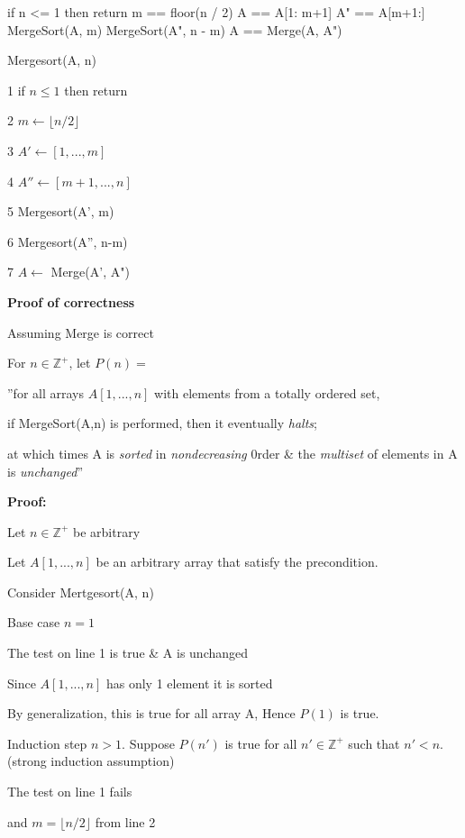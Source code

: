 \documentclass[
]{article}
\newenvironment{Shaded}{}{}
\newcommand{\NormalTok}[1]{#1}
\def\Z {{\mathbb Z}}
\begin{document}
\begin{Shaded}
\begin{Highlighting}[]
\NormalTok{	if n \textless{}= 1 then return}
\NormalTok{	m == floor(n / 2)}
\NormalTok{	A\textquotesingle{} == A[1: m+1]}
\NormalTok{	A" == A[m+1:]}
\NormalTok{	MergeSort(A\textquotesingle{}, m)}
\NormalTok{	MergeSort(A", n {-} m)}
\NormalTok{	A == Merge(A\textquotesingle{}, A")}
\end{Highlighting}
\end{Shaded}

Mergesort(A, n)

1 if \(n\leq 1\) then return

2 \(m\leftarrow \lfloor n/2\rfloor\)

3 \(A' \leftarrow [1,...,m]\)

4 \(A'' \leftarrow [m+1,...,n]\)

5 Mergesort(A', m)

6 Mergesort(A'', n-m)

7 \(A\leftarrow\) Merge(A', A")

\textbf{Proof of correctness}

Assuming Merge is correct

For \(n\in \Z^+\), let \(P(n) = \)

''for all arrays \(A[1,...,n]\) with elements from a totally ordered
set,

if MergeSort(A,n) is performed, then it eventually \emph{halts};

at which times A is \emph{sorted} in \emph{nondecreasing} 0rder \& the
\emph{multiset} of elements in A is \emph{unchanged}''

\textbf{Proof:}

Let \(n\in \Z^+\) be arbitrary

Let \(A[1,...,n]\) be an arbitrary array that satisfy the precondition.

Consider Mertgesort(A, n)

Base case \(n =1\)

The test on line 1 is true \& A is unchanged

Since \(A[1,...,n]\) has only 1 element it is sorted

By generalization, this is true for all array A, Hence \(P(1)\) is true.

Induction step \(n>1\). Suppose \(P(n')\) is true for all \(n'\in \Z^+\)
such that \(n'<n\). (strong induction assumption)

The test on line 1 fails

and \(m =\lfloor n/2\rfloor \) from line 2
\end{document}
